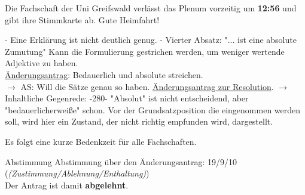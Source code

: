     \begin{info}{}
      Die Fachschaft der Uni Greifswald verlässt das Plenum vorzeitig um \textbf{12:56} und gibt ihre Stimmkarte ab. Gute Heimfahrt!
    \end{info}

    \begin{outline}
      - Eine Erklärung ist nicht deutlich genug.
      - Vierter Absatz: "... ist eine absolute Zumutung" Kann die Formulierung gestrichen werden, um weniger wertende Adjektive zu haben. \\ \underline{Änderungsantrag}: Bedauerlich und absolute streichen. \\
      $\rightarrow$ AS: Will die Sätze genau so haben.
      \1 \underline{Änderungsantrag zur Resolution}. $\rightarrow$ Inhaltliche Gegenrede:
        -280- "Absolut" ist nicht entscheidend, aber "bedauerlicherweiße" schon. Vor der Grundsatzposition die eingenommen werden soll, wird hier ein Zustand, der nicht richtig empfunden wird, dargestellt.
    \end{outline}
    Es folgt eine kurze Bedenkzeit für alle Fachschaften.

    \begin{danger}{Abstimmung}
      Abstimmung über den Änderungsantrag: 19/9/10 (\textit{(Zustimmung/Ablehnung/Enthaltung)}) \\
      Der Antrag ist damit \textbf{abgelehnt}.
    \end{danger}

